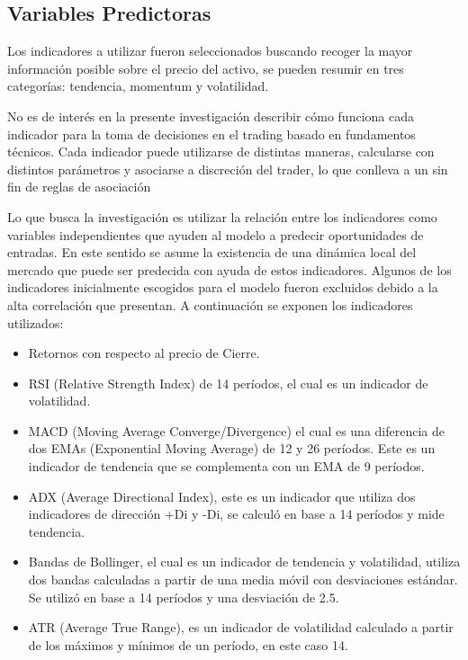 \documentclass[a4paper,12pt]{Latex/Classes/PhDthesisPSnPDF}
\begin{document}
\subsection{Variables Predictoras}

Los indicadores a utilizar fueron seleccionados buscando recoger la mayor información posible sobre el precio del activo, se pueden resumir en tres categorías: tendencia, momentum y volatilidad.

No es de interés en la presente investigación describir cómo funciona cada indicador para la toma de decisiones en el trading basado en fundamentos técnicos. Cada indicador puede utilizarse de distintas maneras, calcularse con distintos parámetros y asociarse a discreción del trader, lo que conlleva a un sin fin de reglas de asociación 

Lo que busca la investigación es utilizar la relación entre los indicadores como variables independientes que ayuden al modelo a predecir oportunidades de entradas. En este sentido se asume la existencia de una dinámica local del mercado que puede ser predecida con ayuda de estos indicadores. Algunos de los indicadores inicialmente escogidos para el modelo fueron excluidos debido a la alta correlación que presentan. A continuación se exponen los indicadores utilizados:

\begin{itemize}
\item Retornos con respecto al precio de Cierre.
\item RSI (Relative Strength Index) de 14 períodos, el cual es un indicador de volatilidad.
\item MACD (Moving Average Converge/Divergence) el cual es una diferencia de dos EMAs (Exponential Moving Average) de 12 y 26 períodos. Este es un indicador de tendencia que se complementa con un EMA de 9 períodos. 
\item ADX (Average Directional Index), este es un indicador que utiliza dos indicadores de dirección +Di y -Di, se calculó en base a 14 períodos y mide tendencia.
\item Bandas de Bollinger, el cual es un indicador de tendencia y volatilidad, utiliza dos bandas calculadas a partir de una media móvil con desviaciones estándar. Se utilizó en base a 14 períodos y una desviación de 2.5.
\item ATR (Average True Range), es un indicador de volatilidad calculado a partir de los máximos y mínimos de un período, en este caso 14.
\end{itemize}
\end{document}
